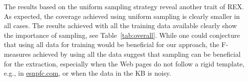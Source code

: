 The results based on the uniform sampling strategy reveal another trait of REX. 
As expected, the coverage achieved using uniform sampling is clearly smaller in all cases. 
The results achieved with all the training data available clearly show the importance of sampling, see Table~\ref{tab:overall}. 
While one could conjecture that using all data for training would be beneficial for our approach, the F-measures achieved by using all the data suggest that sampling can be beneficial for the extraction, especially when the Web pages do not follow a rigid template, e.g., in \url{esnpfc.com}, or when the data in the  \ac{KB} is noisy. 
